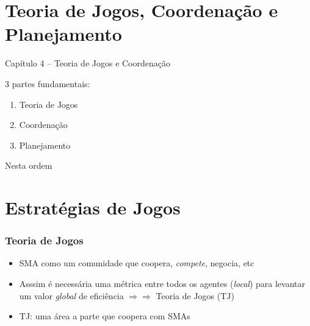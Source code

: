 
\section{Teoria de Jogos, Coordenação e Planejamento}
\begin{frame}

\begin{center}
{\huge Capítulo 4 -- Teoria de Jogos e  Coordenação}

3 partes fundamentais:

\begin{enumerate}
  \item Teoria de Jogos
  \item Coordenação
  \item Planejamento
\end{enumerate}
Nesta ordem
\end{center}

\end{frame}





\section{Estratégias de Jogos}
\begin{frame}

    \frametitle{Teoria de Jogos}
    \begin{itemize}
    \pause
      \item SMA como um comunidade que coopera, \textit{compete},  negocia, etc
      \pause
      \item Asssim é necessária uma métrica 
      entre todos os agentes (\textit{local})
        para levantar um valor \textit{global} de eficiência $\Rightarrow \Rightarrow $ Teoria de Jogos (TJ)
        
        \pause
      \item TJ: uma área a parte que coopera com SMAs
    
    \end{itemize}
\end{frame}



